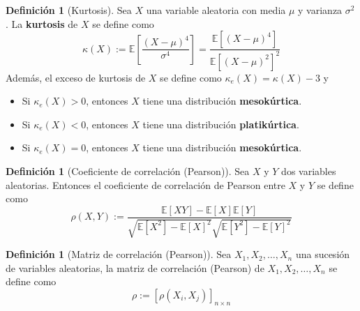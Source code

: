 \documentclass[11pt,a4paper]{book}
\theoremstyle{definition}%
\newtheorem{definicion}[teorema]{Definici\'on}
\newcommand{\EV}[1]{\mathbb{E}\left[#1\right]}
\begin{document}
            \begin{definicion}[Kurtosis]
                Sea $X$ una variable aleatoria con media $\mu$ y varianza $\sigma^2$. La \textbf{kurtosis} de $X$ se define como
                \begin{equation*}
                    \kappa(X) := \EV{\frac{(X-\mu)^4}{\sigma^4}}=\frac{\EV{(X-\mu)^4}}{\EV{(X-\mu)^2}^2}
                \end{equation*}
                Además, el exceso de kurtosis de $X$ se define como $\kappa_e(X) = \kappa(X)-3$ y
                \begin{itemize}
                    \item Si $\kappa_e(X) > 0$, entonces $X$ tiene una distribución \textbf{mesokúrtica}.
                    \item Si $\kappa_e(X) < 0$, entonces $X$ tiene una distribución \textbf{platikúrtica}.
                    \item Si $\kappa_e(X) = 0$, entonces $X$ tiene una distribución \textbf{mesokúrtica}.
                \end{itemize}
            \end{definicion}
            \begin{definicion}[Coeficiente de correlación (Pearson)]
                Sea $X$ y $Y$ dos variables aleatorias. Entonces el coeficiente de correlación de Pearson entre $X$ y $Y$ se define como
                \begin{equation*}
                    \rho(X,Y) := \frac{\EV{XY}-\EV{X}\EV{Y}}{\sqrt{\EV{X^2}-\EV{X}^2}\sqrt{\EV{Y^2}-\EV{Y}^2}}
                \end{equation*}
            \end{definicion}
            \begin{definicion}[Matriz de correlación (Pearson)]
                Sea $X_1, X_2, \dots, X_n$ una sucesión de variables aleatorias, la matriz de correlación (Pearson) de $X_1, X_2, \dots, X_n$ se define como
                \begin{equation*}
                    \rho := [\rho(X_i, X_j)]_{n\times n}
                \end{equation*}
            \end{definicion}
\printbibliography
\end{document}
